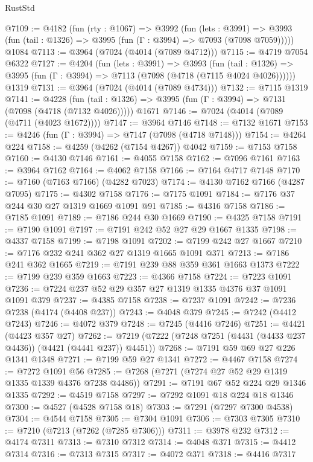 \begin{lexlean}{RustStd}
\begin{coremodule}
@7109 := @4182
    (fun (rty : @1067) =>
    @3992
      (fun (lets : @3991) =>
      @3993 (fun (tail : @1326) => @3995 (fun (Γ : @3994) => @7093 (@7098 @7059)))))
    @1084
@7113 := @3964 (@7024 (@4014 (@7089 @4712)))
@7115 := @4719 @7054 @6322
@7127 := @4204
    (fun (lets : @3991) =>
    @3993
      (fun (tail : @1326) => @3995 (fun (Γ : @3994) => @7113 (@7098 (@4718 (@7115 @4024 @4026))))))
    @1319
@7131 := @3964 (@7024 (@4014 (@7089 @4734)))
@7132 := @7115 @1319
@7141 := @4228
    (fun (tail : @1326) => @3995 (fun (Γ : @3994) => @7131 (@7098 (@4718 (@7132 @4026)))))
    @1671
@7146 := @7024 (@4014 (@7089 (@4711 (@4023 @1672))))
@7147 := @3964 @7146
@7148 := @7132 @1671
@7153 := @4246 (fun (Γ : @3994) => @7147 (@7098 (@4718 @7148)))
@7154 := @4264 @224
@7158 := @4259 (@4262 (@7154 @4267)) @4042
@7159 := @7153 @7158
@7160 := @4130 @7146
@7161 := @4055 @7158
@7162 := @7096 @7161
@7163 := @3964 @7162
@7164 := @4062 @7158
@7166 := @7164 @4717 @7148
@7170 := @7160 (@7163 @7166) (@4282 @7023)
@7174 := @4130 @7162 @7166 (@4287 @7095)
@7175 := @4302 @7158
@7176 := @7175 @1091
@7184 := @7176 @37 @244 @30 @27 @1319 @1669 @1091 @91
@7185 := @4316 @7158
@7186 := @7185 @1091
@7189 := @7186 @244 @30 @1669
@7190 := @4325 @7158
@7191 := @7190 @1091
@7197 := @7191 @242 @52 @27 @29 @1667 @1335
@7198 := @4337 @7158
@7199 := @7198 @1091
@7202 := @7199 @242 @27 @1667
@7210 := @7176 @232 @241 @362 @27 @1319 @1665 @1091 @371
@7213 := @7186 @241 @362 @1665
@7219 := @7191 @239 @88 @359 @361 @1663 @1373
@7222 := @7199 @239 @359 @1663
@7223 := @4366 @7158
@7224 := @7223 @1091
@7236 := @7224 @237 @52 @29 @357 @27 @1319 @1335 @4376 @37 @1091 @1091 @379
@7237 := @4385 @7158
@7238 := @7237 @1091
@7242 := @7236 @7238 (@4174 (@4408 @237))
@7243 := @4048 @379
@7245 := @7242 (@4412 @7243)
@7246 := @4072 @379
@7248 := @7245 (@4416 @7246)
@7251 := @4421 (@4423 @357 @27)
@7262 := @7219 (@7222 (@7248 @7251 (@4431 (@4433 @237 @4436)) (@4421 (@4441 @237)) @4451))
@7268 := @7191 @59 @69 @27 @226 @1341 @1348
@7271 := @7199 @59 @27 @1341
@7272 := @4467 @7158
@7274 := @7272 @1091 @56
@7285 := @7268 (@7271 (@7274 @27 @52 @29 @1319 @1335 @1339 @4376 @7238 @4486))
@7291 := @7191 @67 @52 @224 @29 @1346 @1335
@7292 := @4519 @7158
@7297 := @7292 @1091 @18 @224 @18 @1346
@7300 := @4527 (@4528 @7158 @18)
@7303 := @7291 (@7297 @7300 @4538)
@7304 := @4544 @7158
@7305 := @7304 @1091
@7306 := @7303 @7305
@7310 := @7210 (@7213 (@7262 (@7285 @7306)))
@7311 := @3978 @232
@7312 := @4174 @7311
@7313 := @7310 @7312
@7314 := @4048 @371
@7315 := @4412 @7314
@7316 := @7313 @7315
@7317 := @4072 @371
@7318 := @4416 @7317

\end{coremodule}
\end{lexlean}

